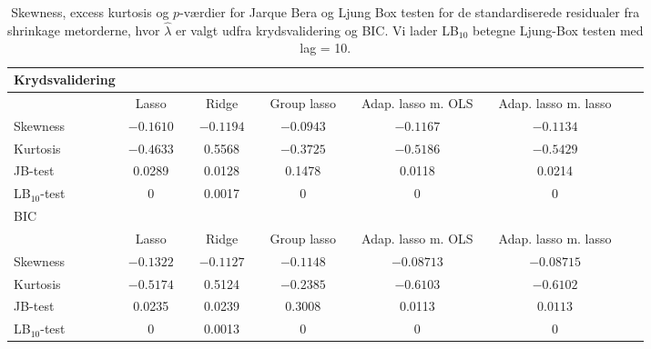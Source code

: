 \begin{sidewaystable} 
\center
\begin{tabular}{lccccccccccc} 
Krydsvalidering\\
\toprule
& Lasso && Ridge  && Group lasso  && Adap. lasso m. OLS  && Adap. lasso m. lasso \\ \midrule
Skewness & $-0.1610$ &&$-0.1194$ && $-0.0943$ & &   $-0.1167$ && $-0.1134$  \\
Kurtosis & $ -0.4633 $ && 0.5568 &&  $-0.3725$ &&    $-0.5186$ && $-0.5429$ \\
JB-test & 0.0289 && 0.0128 &&  0.1478  &&  0.0118 &&  0.0214 \\
LB$_{10}$-test &  0  && 0.0017 && 0  &&  0&  & 0  \\ \bottomrule \toprule
BIC\\ \midrule
& Lasso && Ridge &&Group lasso &  & Adap. lasso m. OLS && Adap. lasso m. lasso  \\ \midrule
Skewness &$-0.1322$ && $-0.1127$ && $-0.1148$ & & $-0.08713$ && $-0.08715$ \\
Kurtosis & $-0.5174$ && 0.5124 &&$-0.2385$ && $-0.6103$ && $-0.6102$\\
JB-test & 0.0235 && 0.0239 && 0.3008   &&   0.0113 &&$0.0113$\\
LB$_{10}$-test & 0 &&  0.0013 && 0  &  & 0 &&  0 \\  \bottomrule
 \end{tabular}
\caption{Skewness, excess kurtosis og \(p\)-værdier for Jarque Bera og Ljung Box testen for de standardiserede residualer fra shrinkage metorderne, hvor $\widehat{\lambda}$ er valgt udfra krydsvalidering og BIC. Vi lader LB$_{10}$ betegne Ljung-Box testen med lag = 10. } \label{tab:res_shrinkage_tab}
\end{sidewaystable}
